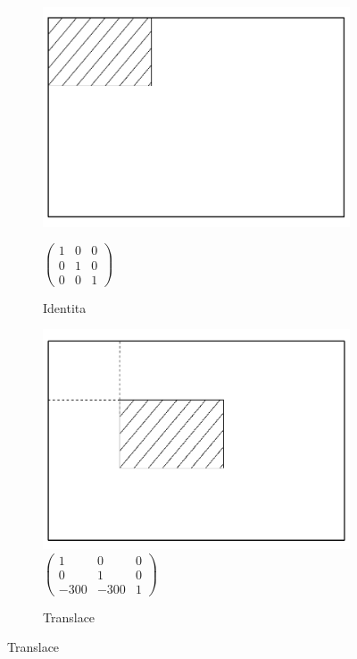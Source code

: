 \begin{figure}[h]
\centering
\begin{subfigure}{0.45\textwidth}
	\includegraphics[width=\linewidth]{../img/kap3_komponenta_identita}
	\centering

$\begin{pmatrix}
1 & 0 & 0 \\
0 & 1 & 0 \\
0 & 0 & 1
\end{pmatrix}$

	\caption{Identita}
	\label{fig:impl:platno_matice_identity}
\end{subfigure}
\begin{subfigure}{0.45\textwidth}
	\includegraphics[width=\linewidth]{../img/kap3_komponenta_translace}
\centering
$\begin{pmatrix}
1 & 0 & 0 \\
0 & 1 & 0 \\
-300 & - 300 & 1
\end{pmatrix}$

	\caption{Translace}
	\label{fig:impl:platno_matice_transformace}
\end{subfigure}
\end{figure}

